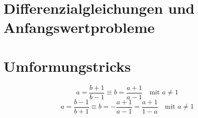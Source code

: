 \documentclass[main.tex]{subfiles}
\begin{document}
\section{Differenzialgleichungen und Anfangswertprobleme}



\section{Umformungstricks}
\[
	a = \frac{b+1}{b-1} \equiv
	b = \frac{a+1}{a-1}\quad \text{mit } a \neq 1
\]
\[
	a = \frac{b-1}{b+1} \equiv
	b = -\frac{a+1}{a-1} = \frac{a+1}{1-a} \quad \text{mit } a \neq 1
\]
\end{document}
